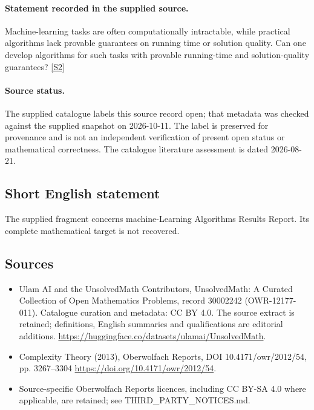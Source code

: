 \documentclass[11pt]{article}
\begin{document}
\paragraph{Statement recorded in the supplied source.}
Machine-learning tasks are often computationally intractable, while practical algorithms lack provable guarantees on running time or solution quality. Can one develop algorithms for such tasks with provable running-time and solution-quality guarantees? \href{https://doi.org/10.4171/owr/2012/54}{[S2]}
\paragraph{Source status.}
The supplied catalogue labels this source record open; that metadata was checked against the supplied snapshot on 2026-10-11. The label is preserved for provenance and is not an independent verification of present open status or mathematical correctness. The catalogue literature assessment is dated 2026-08-21.
\subsection{Short English statement}
The supplied fragment concerns machine-Learning Algorithms Results Report. Its complete mathematical target is not recovered.
\subsection{Sources}
\begin{itemize}
\item[S1] Ulam AI and the UnsolvedMath Contributors, UnsolvedMath: A Curated Collection of Open Mathematics Problems, record 30002242 (OWR-12177-011). Catalogue curation and metadata: CC BY 4.0. The source extract is retained; definitions, English summaries and qualifications are editorial additions.
\url{https://huggingface.co/datasets/ulamai/UnsolvedMath}.
\item[S2] Complexity Theory (2013), Oberwolfach Reports, DOI 10.4171/owr/2012/54, pp. 3267--3304
\url{https://doi.org/10.4171/owr/2012/54}.
\item Source-specific Oberwolfach Reports licences, including CC BY-SA 4.0 where applicable, are retained; see THIRD\_PARTY\_NOTICES.md.
\end{itemize}
\end{document}
